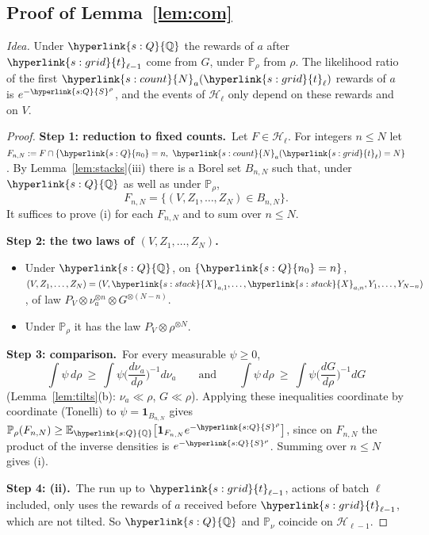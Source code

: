 \documentclass[10pt]{article}
\newcommand{\sy}[2]{{\hyperlink{#1}{#2}}}
\newcommand{\E}{\mathbb{E}}
\newcommand{\PP}{\mathbb{P}}
\newcommand{\1}{\mathbf{1}}
\newcommand{\Ng}{\sy{s:count}{N}}
\newcommand{\Xs}{\sy{s:stack}{X}}
\newcommand{\tl}{\sy{s:grid}{t}}
\newcommand{\QQ}{\sy{s:Q}{\mathbb Q}}
\newcommand{\nzero}{\sy{s:Q}{n_0}}
\newcommand{\Sl}{\sy{s:Q}{S}}
\newcommand{\stp}[2]{\par\medskip\noindent\textbf{Step #1: #2.}\ }
\begin{document}
\subsection{Proof of Lemma~\ref{lem:com}}\label{sec:pf-lem:com}
\noindent\emph{Idea.} Under $\QQ$ the rewards of $a$ after $\tl_{\ell-1}$ come from $G$, under $\PP_\rho$ from $\rho$. The likelihood ratio of the first $\Ng_a(\tl_\ell)$
rewards of $a$ is $e^{-\Sl^\rho}$, and the events of $\mathcal H_\ell$ only depend on these rewards and on $V$.

\begin{proof}
\stp1{reduction to fixed counts}Let $F\in\mathcal H_\ell$. For integers $n\le N$ let $F_{n,N}:=F\cap\{\nzero=n,\ \Ng_a(\tl_\ell)=N\}$. By Lemma~\ref{lem:stacks}(iii) there is a
Borel set $B_{n,N}$ such that, under $\QQ$ as well as under $\PP_\rho$,
\[
F_{n,N}=\big\{(V,Z_1,\dots,Z_N)\in B_{n,N}\big\}.
\]
It suffices to prove (i) for each $F_{n,N}$ and to sum over $n\le N$.

\stp2{the two laws of $(V,Z_1,\dots,Z_N)$}
\begin{itemize}
\item Under $\QQ$, on $\{\nzero=n\}$, $(V,Z_1,\dots,Z_N)=(V,\Xs_{a,1},\dots,\Xs_{a,n},Y_1,\dots,Y_{N-n})$, of law $P_V\otimes\nu_a^{\otimes n}\otimes G^{\otimes(N-n)}$.
\item Under $\PP_\rho$ it has the law $P_V\otimes\rho^{\otimes N}$.
\end{itemize}

\stp3{comparison}For every measurable $\psi\ge0$,
\[
\int\psi\,d\rho\ \ge\ \int\psi\Big(\frac{d\nu_a}{d\rho}\Big)^{-1}d\nu_a\qquad\text{and}\qquad\int\psi\,d\rho\ \ge\ \int\psi\Big(\frac{dG}{d\rho}\Big)^{-1}dG
\]
(Lemma~\ref{lem:tilts}(b): $\nu_a\ll\rho$, $G\ll\rho$). Applying these inequalities coordinate by coordinate (Tonelli) to $\psi=\1_{B_{n,N}}$ gives
$\PP_\rho(F_{n,N})\ge\E_\QQ\big[\1_{F_{n,N}}e^{-\Sl^\rho}\big]$, since on $F_{n,N}$ the product of the inverse densities is $e^{-\Sl^\rho}$. Summing over $n\le N$ gives (i).

\stp4{(ii)}The run up to $\tl_{\ell-1}$, actions of batch $\ell$ included, only uses the rewards of $a$ received before $\tl_{\ell-1}$, which are not tilted. So $\QQ$ and
$\PP_\nu$ coincide on $\mathcal H_{\ell-1}$.
\end{proof}

\end{document}
